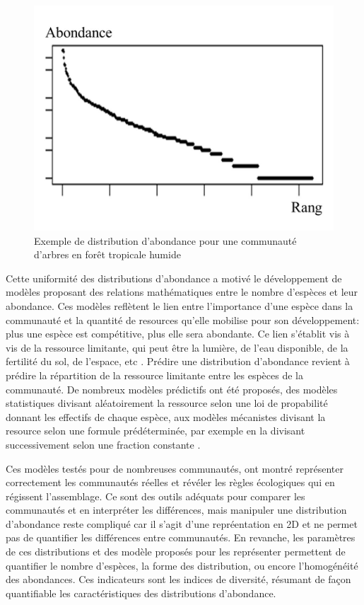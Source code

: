 \documentclass[
  11pt,
  french,
  A4paper,
  extrafontsizes,onecolumn,openright
  ]{memoir}
\begin{document}
\begin{figure}

{\centering \includegraphics[width=0.6\linewidth]{ExternalFig/SpeciesAbdDist} 

}

\caption{Exemple de distribution d'abondance pour une communauté d'arbres en forêt tropicale humide}\label{fig:AbdDist}
\end{figure}

Cette uniformité des distributions d'abondance a motivé le développement
de modèles proposant des relations mathématiques entre le nombre
d'espèces et leur abondance. Ces modèles reflètent le lien entre
l'importance d'une espèce dans la communauté et la quantité de resources
qu'elle mobilise pour son développement: plus une espèce est
compétitive, plus elle sera abondante. Ce lien s'établit vis à vis de la
ressource limitante, qui peut être la lumière, de l'eau disponible, de
la fertilité du sol, de l'espace, etc
\autocites{Silvertown2004}{terSteege2006}. Prédire une distribution
d'abondance revient à prédire la répartition de la ressource limitante
entre les espèces de la communauté. De nombreux modèles prédictifs ont
été proposés, des modèles statistiques divisant aléatoirement la
ressource selon une loi de propabilité donnant les effectifs de chaque
espèce, aux modèles mécanistes divisant la resource selon une formule
prédéterminée, par exemple en la divisant successivement selon une
fraction constante
\autocites{Fisher1943}{Motomura1932}{Tokeshi1993}{Magurran1988}.

Ces modèles testés pour de nombreuses communautés, ont montré
représenter correctement les communautés réelles et révéler les règles
écologiques qui en régissent l'assemblage. Ce sont des outils adéquats
pour comparer les communautés et en interpréter les différences, mais
manipuler une distribution d'abondance reste compliqué car il s'agit
d'une repréentation en 2D et ne permet pas de quantifier les différences
entre communautés. En revanche, les paramètres de ces distributions et
des modèle proposés pour les représenter permettent de quantifier le
nombre d'espèces, la forme des distribution, ou encore l'homogénéité des
abondances. Ces indicateurs sont les indices de diversité, résumant de
façon quantifiable les caractéristiques des distributions d'abondance.
\end{document}
